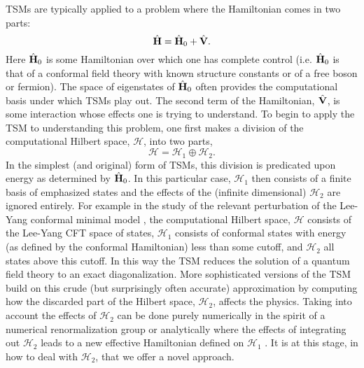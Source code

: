 \documentclass[twocolumn,secnumarabic,amssymb, nobibnotes, aps, prd]{revtex4-2}
\begin{document}
TSMs are typically applied to a problem where the Hamiltonian comes in two parts:
\begin{equation}
     \hat{\bf H} = \hat{\bf H}_0 + \hat{\bf  V}.
\end{equation}
Here $\hat{\bf{H}}_0$ is some Hamiltonian over which one has complete control (i.e. $\hat{\bf H}_0$ is that of a conformal field theory with known structure constants or of a free boson or fermion).  The space of eigenstates of $\hat{\bf H}_0$ often provides the computational basis under which TSMs play out.  The second term of the Hamiltonian, ${\hat{\bf V}}$, is some interaction whose effects one is trying to understand.  
To begin to apply the TSM to understanding this problem, one first makes a division of the computational Hilbert space, $\mathcal{H}$, into two parts, 
\begin{equation}
    \mathcal{H} = \mathcal{H}_1\oplus \mathcal{H}_2.
\end{equation}
In the simplest (and original) form of TSMs, this division is predicated upon energy as determined by $\hat{\bf H}_0$.  In this particular case, $\mathcal{H}_1$ then consists of a finite basis of emphasized states and the effects of the (infinite dimensional) $\mathcal{H}_2$ are ignored entirely.  For example in the study of the relevant perturbation of the Lee-Yang conformal minimal model \cite{yurov1990truncated}, the computational Hilbert space,  $\mathcal{H}$ consists of the Lee-Yang CFT space of states, $\mathcal{H}_1$ consists of conformal states with energy (as defined by the conformal Hamiltonian) less than some cutoff, and $\mathcal{H}_2$ all states above this cutoff.  In this way the TSM reduces the solution of a quantum field theory to an exact diagonalization.  More sophisticated versions of the TSM build on this crude (but surprisingly often accurate) approximation by computing how the discarded part of the Hilbert space, $\mathcal{H}_2$, affects the physics.  Taking into account the effects of $\mathcal{H}_2$ can be done purely numerically in the spirit of a numerical renormalization group \cite{nrg} or analytically where the effects of integrating out $\mathcal{H}_2$ leads to a new effective Hamiltonian defined on $\mathcal{H}_1$ \cite{feverati2006renormalisation,giokas2011renormalisation, Lencses:2014tba, Hogervorst:2014rta,Elias-Miro:2017tup}. It is at this stage, in how to deal with $\mathcal{H}_2$, that we offer a novel approach.  
\end{document}
